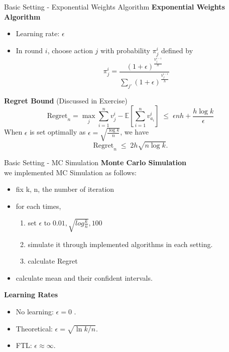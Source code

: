 \documentclass{beamer}
\begin{document}
\begin{frame}{Basic Setting - Exponential Weights Algorithm}
    \textbf{Exponential Weights Algorithm}\\[3pt]
    \begin{itemize}
        \item Learning rate: $\epsilon$
        \item In round $i$, choose action $j$ with probability $\pi_j^i$ defined by
        {\scriptsize
        \[
            \pi_j^i = 
            \frac{(1+\epsilon)^{\frac{V_j^{i-1}}{h}}}
            {\sum_{j'} (1+\epsilon)^{\frac{V_{j'}^{i-1}}{h}}}
        \]
        }
    \end{itemize}

    \vspace{2pt}
    \textbf{Regret Bound} (Discussed in Exercise)\\[3pt]
    \[
    \mathrm{Regret}_n 
    = 
    \max_j \sum_{i=1}^{n} v_j^i 
    - 
    \mathbb{E}\!\left[\sum_{i=1}^{n} v_{a_i}^i\right]
    \;\le\;
    \epsilon n h + \frac{h \log k}{\epsilon}
    \]
    When $\epsilon$ is set optimally as 
    $\epsilon = \sqrt{\frac{\log k}{n}}$, we have
    \[
    \mathrm{Regret}_n \;\le\; 2h\sqrt{n \log k}.
    \]
\end{frame}


\begin{frame}{Basic Setting - MC Simulation}
    \textbf{Monte Carlo Simulation}\\
    we implemented MC Simulation as follows:
    \begin{itemize}
        \item fix k, n, the number of iteration
        \item for each times, 
        \begin{enumerate}
            \item set $\epsilon$ to {$0.01, \sqrt{log\frac{k}{n}}, 100$}
            \item simulate it through implemented algorithms in each setting.
            \item calculate Regret
        \end{enumerate}
        \item calculate mean and their confident intervals.
    \end{itemize}
    \textbf{Learning Rates}\\
    \begin{itemize}
      \item No learning: \(\epsilon = 0\) .
      \item Theoretical: \(\epsilon = \sqrt{\ln k / n}\).
      \item FTL:  \(\epsilon \approx \infty\).
    \end{itemize}
\end{frame}
\end{document}
